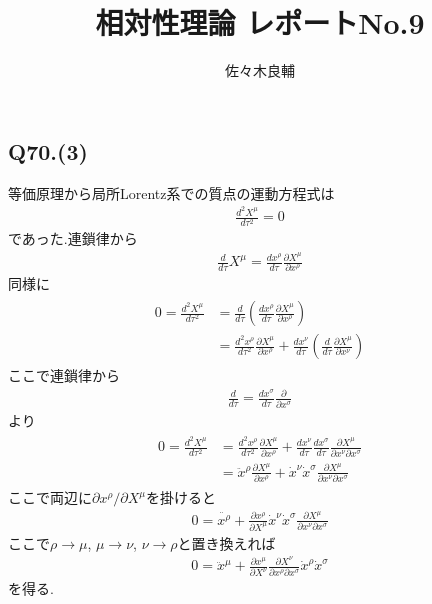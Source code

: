 \documentclass[uplatex,a4j,11pt,dvipdfmx]{jsarticle}
\begin{document}
\title{相対性理論 レポートNo.9}
\author{佐々木良輔}
\date{}
\maketitle
\subsection*{Q70.(3)}
等価原理から局所Lorentz系での質点の運動方程式は
\begin{align}
  \frac{d^2X^\mu}{d\tau^2}=0
\end{align}
であった.連鎖律から
\begin{align}
  \frac{d}{d\tau}X^\mu=\frac{dx^\rho}{d\tau}\frac{\partial X^\mu}{\partial x^\rho}
\end{align}
同様に
\begin{align}
  \begin{split}
    0=\frac{d^2X^\mu}{d\tau^2}&=\frac{d}{d\tau}\left(\frac{dx^\rho}{d\tau}\frac{\partial X^\mu}{\partial x^\rho}\right)\\
    &=\frac{d^2 x^\rho}{d\tau^2}\frac{\partial X^\mu}{\partial x^\rho}
    +\frac{dx^\nu}{d\tau}\left(\frac{d}{d\tau}\frac{\partial X^\mu}{\partial x^\nu}\right)
  \end{split}
\end{align}
ここで連鎖律から
\begin{align}
  \frac{d}{d\tau}=\frac{dx^\sigma}{d\tau}\frac{\partial}{\partial x^\sigma}
\end{align}
より
\begin{align}
  \begin{split}
    0=\frac{d^2X^\mu}{d\tau^2}&=\frac{d^2 x^\rho}{d\tau^2}\frac{\partial X^\mu}{\partial x^\rho}
    +\frac{dx^\nu}{d\tau}\frac{dx^\sigma}{d\tau}\frac{\partial X^\mu}{\partial x^\nu\partial x^\sigma}\\
    &=\ddot{x}^\rho\frac{\partial X^\mu}{\partial x^\rho}+\dot{x}^\nu\dot{x}^\sigma\frac{\partial X^\mu}{\partial x^\nu\partial x^\sigma}
  \end{split}
\end{align}
ここで両辺に$\partial x^\rho/\partial X^\mu$を掛けると
\begin{align}
  0=\ddot{x^\rho}+\frac{\partial x^\rho}{\partial X^\mu}\dot{x}^\nu\dot{x}^\sigma\frac{\partial X^\mu}{\partial x^\nu\partial x^\sigma}
\end{align}
ここで$\rho\rightarrow\mu$, $\mu\rightarrow\nu$, $\nu\rightarrow\rho$と置き換えれば
\begin{align}
  0=\ddot{x}^\mu+\frac{\partial x^\mu}{\partial X^\nu}\frac{\partial X^\nu}{\partial x^\rho\partial x^\sigma}\dot{x}^\rho\dot{x}^\sigma
\end{align}
を得る.
\end{document}
